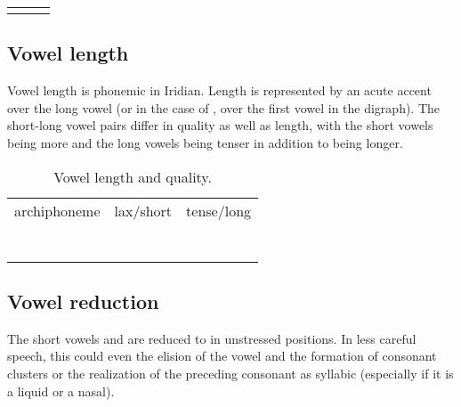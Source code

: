 \begin{table}[h!]
	\centering \small
	\begin{tabularx}{0.8\textwidth}{>{\bfseries}YYY}
				&  & \\
	\end{tabularx}
\end{table}

\subsection{Vowel length}

Vowel length is phonemic in Iridian. Length is represented by an acute accent over the long vowel (or in the case of \bt{\o}, over the first vowel in the digraph). The short-long vowel pairs differ in quality as well as length, with the short vowels being more and the long vowels being tenser in addition to being longer.

\begin{table}
	\small\centering
	\caption{Vowel length and quality.}
	\begin{tabu} to 0.7 \textwidth{MMM}
		\toprule \addlinespace
		{\sc archiphoneme} & {\sc lax/short} &{\sc tense/long}\\ \addlinespace\midrule
		\addlinespace
			& 	& 		\\\addlinespace
			& 	& 		\\\addlinespace
			& 	& 		\\\addlinespace
			& 	& 		\\\addlinespace
			& 	& 		\\\addlinespace
			& 	& 		\\\addlinespace
		\bottomrule		
	\end{tabu} 
\end{table}

\subsection{Vowel reduction}
The short vowels  and  are reduced to  in unstressed positions. In less careful speech, this could even the elision of the vowel and the formation of consonant clusters or the realization of the preceding consonant as syllabic (especially if it is a liquid or a nasal).

